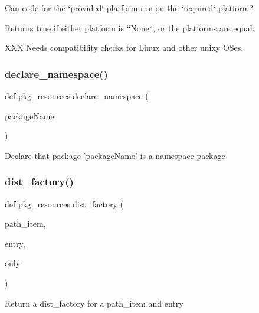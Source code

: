 \begin{DoxyVerb}Can code for the `provided` platform run on the `required` platform?

Returns true if either platform is ``None``, or the platforms are equal.

XXX Needs compatibility checks for Linux and other unixy OSes.
\end{DoxyVerb}
 \mbox{\label{namespacepkg__resources_a56e0436c68d4a6a6d3674c418b628593}} 
\subsubsection{\texorpdfstring{declare\+\_\+namespace()}{declare\_namespace()}}
{\footnotesize\ttfamily def pkg\+\_\+resources.\+declare\+\_\+namespace (\begin{DoxyParamCaption}\item[{}]{package\+Name }\end{DoxyParamCaption})}

\begin{DoxyVerb}Declare that package 'packageName' is a namespace package\end{DoxyVerb}
 \mbox{\label{namespacepkg__resources_a2dd2cfe9de57b827c6747e80e1ef18e2}} 
\subsubsection{\texorpdfstring{dist\+\_\+factory()}{dist\_factory()}}
{\footnotesize\ttfamily def pkg\+\_\+resources.\+dist\+\_\+factory (\begin{DoxyParamCaption}\item[{}]{path\+\_\+item,  }\item[{}]{entry,  }\item[{}]{only }\end{DoxyParamCaption})}

\begin{DoxyVerb}Return a dist_factory for a path_item and entry
\end{DoxyVerb}
 \mbox{\label{namespacepkg__resources_abbb0c07a5cceabd55690cf052dfbea0d}} 
